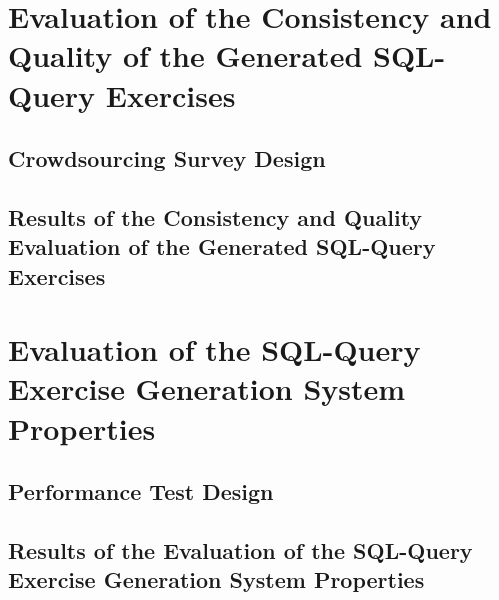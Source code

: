 \section{Evaluation of the Consistency and Quality of the Generated SQL-Query Exercises}
\label{sec:eval:quality}

\subsection{Crowdsourcing Survey Design}
\label{sec:eval:quality:function}


\subsection{Results of the Consistency and Quality Evaluation of the Generated SQL-Query Exercises}
\label{sec:eval:quality:result}



\section{Evaluation of the SQL-Query Exercise Generation System Properties}
\label{sec:eval:properties}

\subsection{Performance Test Design }
\label{sec:eval:properties:function}


\subsection{Results of the Evaluation of the SQL-Query Exercise Generation System Properties}
\label{sec:eval:properties:result}







